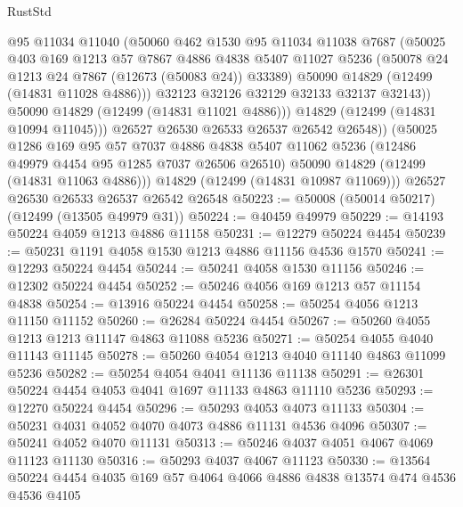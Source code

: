 \begin{lexlean}{RustStd}
\begin{coremodule}
                @95
                @11034
                @11040
                (@50060
                  @462
                  @1530
                  @95
                  @11034
                  @11038
                  @7687
                  (@50025
                    @403
                    @169
                    @1213
                    @57
                    @7867
                    @4886
                    @4838
                    @5407
                    @11027
                    @5236
                    (@50078 @24 @1213 @24 @7867 (@12673 (@50083 @24)) @33389)
                    @50090
                    @14829
                    (@12499 (@14831 @11028 @4886)))
                  @32123
                  @32126
                  @32129
                  @32133
                  @32137
                  @32143))
              @50090
              @14829
              (@12499 (@14831 @11021 @4886)))
            @14829
            (@12499 (@14831 @10994 @11045)))
          @26527
          @26530
          @26533
          @26537
          @26542
          @26548))
      (@50025
        @1286
        @169
        @95
        @57
        @7037
        @4886
        @4838
        @5407
        @11062
        @5236
        (@12486 @49979 @4454 @95 @1285 @7037 @26506 @26510)
        @50090
        @14829
        (@12499 (@14831 @11063 @4886)))
      @14829
      (@12499 (@14831 @10987 @11069)))
    @26527
    @26530
    @26533
    @26537
    @26542
    @26548
@50223 := @50008 (@50014 @50217) (@12499 (@13505 @49979 @31))
@50224 := @40459 @49979
@50229 := @14193 @50224 @4059 @1213 @4886 @11158
@50231 := @12279 @50224 @4454
@50239 := @50231 @1191 @4058 @1530 @1213 @4886 @11156 @4536 @1570
@50241 := @12293 @50224 @4454
@50244 := @50241 @4058 @1530 @11156
@50246 := @12302 @50224 @4454
@50252 := @50246 @4056 @169 @1213 @57 @11154 @4838
@50254 := @13916 @50224 @4454
@50258 := @50254 @4056 @1213 @11150 @11152
@50260 := @26284 @50224 @4454
@50267 := @50260 @4055 @1213 @1213 @11147 @4863 @11088 @5236
@50271 := @50254 @4055 @4040 @11143 @11145
@50278 := @50260 @4054 @1213 @4040 @11140 @4863 @11099 @5236
@50282 := @50254 @4054 @4041 @11136 @11138
@50291 := @26301 @50224 @4454 @4053 @4041 @1697 @11133 @4863 @11110 @5236
@50293 := @12270 @50224 @4454
@50296 := @50293 @4053 @4073 @11133
@50304 := @50231 @4031 @4052 @4070 @4073 @4886 @11131 @4536 @4096
@50307 := @50241 @4052 @4070 @11131
@50313 := @50246 @4037 @4051 @4067 @4069 @11123 @11130
@50316 := @50293 @4037 @4067 @11123
@50330 := @13564 @50224 @4454 @4035 @169 @57 @4064 @4066 @4886 @4838 @13574 @474 @4536 @4536 @4105

\end{coremodule}
\end{lexlean}
